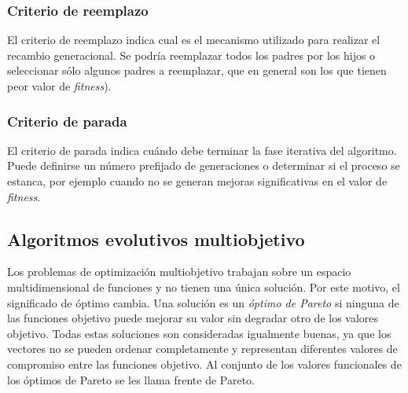 \subsubsection{Criterio de reemplazo} 
El criterio de reemplazo indica cual es el mecanismo utilizado para realizar el recambio generacional. Se podría reemplazar todos los padres por los hijos o seleccionar sólo algunos padres a reemplazar, que en general son los que tienen peor valor de \emph{fitness}).

\subsubsection{Criterio de parada} 
El criterio de parada indica cuándo debe terminar la fase iterativa del algoritmo. Puede definirse un número prefijado de generaciones o determinar si el proceso se estanca, por ejemplo cuando no se generan mejoras significativas en el valor de \emph{fitness}.



%
%


\subsection{Algoritmos evolutivos multiobjetivo}

Los problemas de optimización multiobjetivo trabajan sobre un espacio multidimensional de funciones y no tienen una única solución. Por este motivo, el significado de óptimo cambia. Una solución es un \emph{óptimo de Pareto} si ninguna de las funciones objetivo puede mejorar su valor sin degradar otro de los valores objetivo. Todas estas soluciones son consideradas igualmente buenas, ya que los vectores no se pueden ordenar completamente y representan diferentes valores de compromiso entre las funciones objetivo. Al conjunto de los valores funcionales de los óptimos de Pareto se les llama frente de Pareto.

